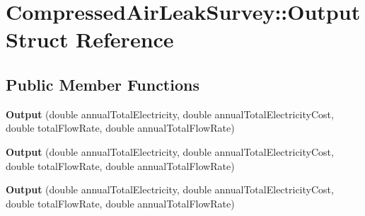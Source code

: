 \hypertarget{struct_compressed_air_leak_survey_1_1_output}{}\section{Compressed\+Air\+Leak\+Survey\+:\+:Output Struct Reference}
\label{struct_compressed_air_leak_survey_1_1_output}
\subsection*{Public Member Functions}
\begin{DoxyCompactItemize}
\item 
\mbox{\label{struct_compressed_air_leak_survey_1_1_output_a58c79c8babdcf3ba8e3ce45567ce6556}} 
{\bfseries Output} (double annual\+Total\+Electricity, double annual\+Total\+Electricity\+Cost, double total\+Flow\+Rate, double annual\+Total\+Flow\+Rate)
\item 
\mbox{\label{struct_compressed_air_leak_survey_1_1_output_a58c79c8babdcf3ba8e3ce45567ce6556}} 
{\bfseries Output} (double annual\+Total\+Electricity, double annual\+Total\+Electricity\+Cost, double total\+Flow\+Rate, double annual\+Total\+Flow\+Rate)
\item 
\mbox{\label{struct_compressed_air_leak_survey_1_1_output_a58c79c8babdcf3ba8e3ce45567ce6556}} 
{\bfseries Output} (double annual\+Total\+Electricity, double annual\+Total\+Electricity\+Cost, double total\+Flow\+Rate, double annual\+Total\+Flow\+Rate)
\end{DoxyCompactItemize}
